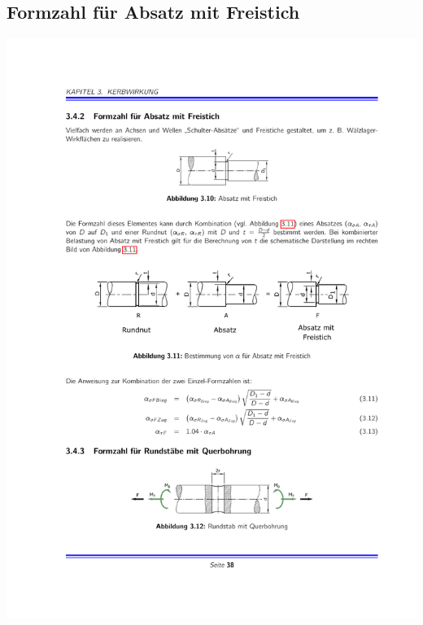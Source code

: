 	\subsection{Formzahl für Absatz mit Freistich} %
		\begin{center}
			\includegraphics{graphics/freistich_kerbe_1}\\

\end{center}
